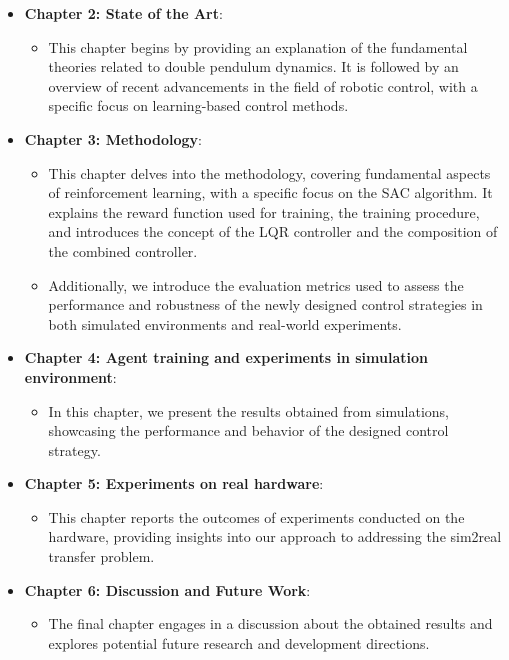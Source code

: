 \begin{itemize}
  \item \textbf{Chapter 2: State of the Art}:
    \begin{itemize}
      \item This chapter begins by providing an explanation of the fundamental theories related to double pendulum dynamics. It is followed by an overview of recent advancements in the field of robotic control, with a specific focus on learning-based control methods.
    \end{itemize}
  
  \item \textbf{Chapter 3: Methodology}:
    \begin{itemize}
      \item This chapter delves into the methodology, covering fundamental aspects of reinforcement learning, with a specific focus on the SAC algorithm. It explains the reward function used for training, the training procedure, and introduces the concept of the LQR controller and the composition of the combined controller.

      \item Additionally, we introduce the evaluation metrics used to assess the performance and robustness of the newly designed control strategies in both simulated environments and real-world experiments.
    \end{itemize}

  
  \item \textbf{Chapter 4: Agent training and experiments in simulation environment}:
    \begin{itemize}
      \item In this chapter, we present the results obtained from simulations, showcasing the performance and behavior of the designed control strategy.
    \end{itemize}
  
  \item \textbf{Chapter 5: Experiments on real hardware}:
    \begin{itemize}
      \item This chapter reports the outcomes of experiments conducted on the hardware, providing insights into our approach to addressing the sim2real transfer problem.
    \end{itemize}
  
  \item \textbf{Chapter 6: Discussion and Future Work}:
    \begin{itemize}
      \item The final chapter engages in a discussion about the obtained results and explores potential future research and development directions.
    \end{itemize}
\end{itemize}


\cleardoublepage
